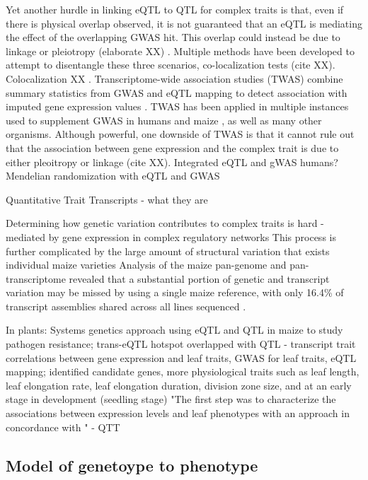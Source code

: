 \documentclass[article,9pt,twocolumn,twoside]{rilabRxiv}
\begin{document}
Yet another hurdle in linking eQTL to QTL for complex traits is that, even if there is physical overlap observed, it is not guaranteed that an eQTL is mediating the effect of the overlapping GWAS hit.
This overlap could instead be due to linkage or pleiotropy (elaborate XX) \citep{Yao}.
Multiple methods have been developed to attempt to disentangle these three scenarios, co-localization tests (cite XX).
Colocalization XX \citep{Hormozdiari}.
Transcriptome-wide association studies (TWAS) combine summary statistics from GWAS and eQTL mapping to detect association with imputed gene expression values \citep{LiRitchie}.
TWAS has been applied in multiple instances used to supplement GWAS in humans \citep{Gusev2} and maize \citep{Kremling}, as well as many other organisms.
Although powerful, one downside of TWAS is that it cannot rule out that the association between gene expression and the complex trait is due to either pleoitropy or linkage (cite XX).
\cite{Zhu} Integrated eQTL and gWAS humans?
\cite{Porcu} Mendelian randomization with eQTL and GWAS

Quantitative Trait Transcripts - what they are

Determining how genetic variation contributes to complex traits is hard
- mediated by gene expression in complex regulatory networks
\citep{AlbertKruglyak}
\citep{Wallace3}
This process is further complicated by the large amount of structural variation that exists  individual maize varieties \citep{Wang2,Chakraborty,Haberer}
Analysis of the maize pan-genome and pan-transcriptome revealed that a substantial portion of genetic and transcript variation may be missed by using a single maize reference, with only 16.4\% of transcript assemblies 
 shared across all lines sequenced \citep{Hirsch}.

In plants:
\cite{Christie} Systems genetics approach using eQTL and QTL in maize to study pathogen resistance; trans-eQTL hotspot overlapped with QTL
\cite{Miculan} - transcript trait correlations between gene expression and leaf traits, GWAS for leaf traits, eQTL mapping; identified candidate genes, more physiological traits such as leaf length, leaf elongation rate, leaf elongation duration, division zone size, and at an early stage in development (seedling stage)
"The first step was to characterize the associations between expression levels and leaf phenotypes with an approach in concordance with \cite{Baute2}" - QTT

\subsection{Model of genetoype to phenotype}
\end{document}

